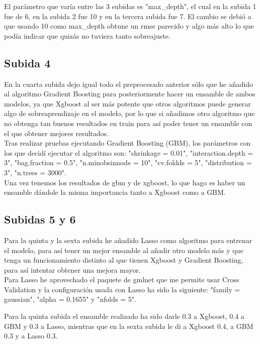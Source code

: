 \documentclass[14pt]{extarticle}
\begin{document}
El parámetro que varía entre las 3 subidas es "max\_depth", el cual en la subida 1 fue de 6, en la subida 2 fue 10 y en la tercera subida fue 7. El cambio se debió a que usando 10 como max\_depth obtune un rmse parecido y algo más alto lo que podía indicar que quizás no tuviera tanto sobreajuste. \\


\subsection{Subida 4}
En la cuarta subida dejo igual todo el preprocesado anterior sólo que he añadido al algoritmo Gradient Boosting para posteriormente hacer un ensamble de ambos modelos, ya que Xgboost al ser más potente que otros algoritmos puede generar algo de sobreaprendizaje en el modelo, por lo que si añadimos otro algoritmo que no obtenga tan buenos resultados en train para así poder tener un ensamble con el que obtener mejores resultados. \\

Tras realizar pruebas ejecutando Gradient Boosting (GBM), los parámetros con los que decidí ejecutar el algoritmo son: "shrinkage = 0.01", "interaction.depth = 3", "bag.fraction = 0.5", "n.minobsinnode = 10", "cv.foldds = 5", "distribution = 3", "n.trees = 3000".  \\

Una vez tenemos los resultados de gbm y de xgboost, lo que hago es haber un ensamble dándole la misma importancia tanto a Xgboost como a GBM. \\

\subsection{Subidas 5 y 6}
Para la quinta y la sexta subida he añadido Lasso como algoritmo para entrenar el modelo, para así tener un mejor ensamble al añadir otro modelo más y que tenga un funcionamiento distinto al que tienen Xgboost y Gradient Boosting, para así intentar obtener una mejora mayor.  \\

Para Lasso he aprovechado el paquete de gmlnet que me permite usar Cross Validation y la configuración usada con Lasso ha sido la siguiente: "family = gaussian", "alpha = 0.1655" y "nfolds = 5".

Para la quinta subida el ensamble realizado ha sido darle 0.3 a Xgboost, 0.4 a GBM y 0.3 a Lasso, mientras que en la sexta subida le di a Xgboost 0.4, a GBM 0.3 y a Lasso 0.3. \\
\end{document}
